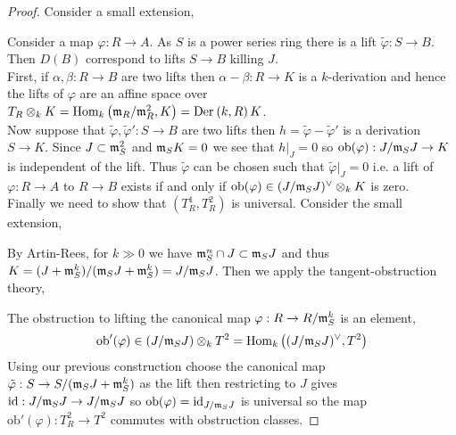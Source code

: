 \documentclass[12pt]{article}
\newcommand{\ob}{\mathrm{ob}}
\begin{document}
\begin{proof}
Consider a small extension,
\begin{center}
\end{center}
Consider a map $\varphi : R \to A$. As $S$ is a power series ring there is a lift $\tilde{\varphi} : S \to B$. Then $D(B)$ correspond to lifts $S \to B$ killing $J$. 
\bigskip\\
First, if $\alpha, \beta : R \to B$ are two lifts then $\alpha - \beta : R \to K$ is a $k$-derivation and hence the lifts of $\varphi$ are an affine space over $T_R \otimes_k K = \mathrm{Hom}_{k} \left( \mathfrak{m}_R/\mathfrak{m}_R^2, K \right) = \mathrm{Der}_{} \left( k, R \right){K}$. 
\bigskip\\
Now suppose that $\tilde{\varphi}, \tilde{\varphi}' : S \to B$ are two lifts then $h = \tilde{\varphi} - \tilde{\varphi}'$ is a derivation $S \to K$. Since $J \subset \mathfrak{m}_S^2$ and $\mathfrak{m}_S K = 0$ we see that $h|_J = 0$ so $\ob(\varphi) : J/\m_S J \to K$ is independent of the lift. Thus $\tilde{\varphi}$ can be chosen such that $\tilde{\varphi}|_J = 0$ i.e. a lift of $\varphi : R \to A$ to $R \to B$ exists if and only if $\ob(\varphi) \in (J / \m_S J)^\vee \ot_k K$ is zero. 
\bigskip\\
Finally we need to show that $(T^1_R, T^2_R)$ is universal. Consider the small extension,
\begin{center}
\end{center}
By Artin-Rees, for $k \gg 0$ we have $\mathfrak{m}_S^n \cap J \subset \mathfrak{m}_S J$ and thus $K = (J + \mathfrak{m}_S^k)/(\mathfrak{m}_S J + \mathfrak{m}_S^k) = J / \mathfrak{m}_S J$. Then we apply the tangent-obstruction theory,
\begin{center}
\end{center}
The obstruction to lifting the canonical map $\varphi : R \to R / \mathfrak{m}_S^k$ is an element,
\[ \ob'(\varphi) \in (J / \m_S J) \ot_k T^2 = \Hom{k}{(J / \m_S J)^\vee}{T^2} \]
Using our previous construction choose the canonical map $\tilde{\varphi} : S \to S /(\mathfrak{m}_S J + \mathfrak{m}_S^k)$ as the lift then restricting to $J$ gives $\mathrm{id} : J / \mathfrak{m}_S J \to J / \mathfrak{m}_S J$ so $\ob(\varphi) = \id_{J/\m_S J}$ is universal so the map $\ob'(\varphi) : T^2_R \to T^2$ commutes with obstruction classes.

\end{proof}
\end{document}
